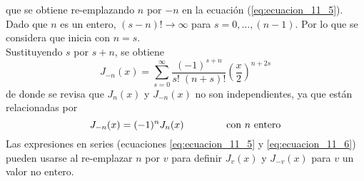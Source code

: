 que se obtiene re-emplazando $n$ por $-n$ en la ecuación (\ref{eq:ecuacion_11_5}). Dado que $n$ es un entero, $(s-n)! \to \infty$ para $s=0, \ldots,(n-1)$. Por lo que se considera que inicia con $n=s$.
\\
Sustituyendo $s$ por $s+n$, se obtiene
\begin{equation}
J_{-n}(x) = \sum_{s=0}^{\infty} \dfrac{(-1)^{s+n}}{s! \; (n+s)!} \left( \dfrac{x}{2} \right)^{n+2s}
\label{eq:ecuacion_11_7}
\end{equation}
de donde se revisa que $J_{n}(x)$ y $J_{-n}(x)$ no son independientes, ya que están relacionadas por
\begin{equation}
J_{-n}(x) = (-1)^{n} J_{n}(x) \hspace{1.5cm} \text{con $n$ entero}
\label{eq:ecuacion_11_8}
\end{equation}
Las expresiones en series (ecuaciones \ref{eq:ecuacion_11_5} y \ref{eq:ecuacion_11_6}) pueden usarse al re-emplazar $n$ por $v$ para definir $J_{v}(x)$ y $J_{-v}(x)$ para $v$ un valor no entero.
